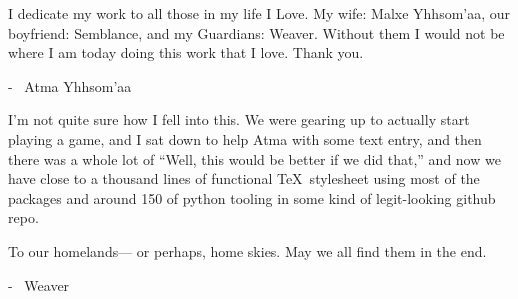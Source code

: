\begin{multicols}{2}
I dedicate my work to all those in my life I Love.  My wife: Malxe Yhhsom'aa, our boyfriend: Semblance, and my Guardians: Weaver.  Without them I would not be where I am today doing this work that I love.  Thank you. \pc%

- {\ferrum\ Atma Yhhsom'aa}\pw%

I'm not quite sure how I fell into this. We were gearing up to actually start playing a game, and I sat down to help Atma with some text entry, and then there was a whole lot of “Well, this would be better if we did that,” and now we have close to a thousand lines of functional \TeX\ stylesheet using most of the packages and around 150 of python tooling in some kind of legit-looking github repo.\pc%

To our homelands--- or perhaps, home skies. May we all find them in the end.\pc%

- {\ferrum\ Weaver}%
\end{multicols}